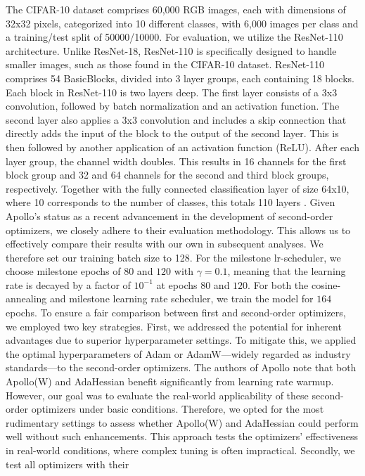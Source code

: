The CIFAR-10 dataset comprises 60,000 RGB images, each with dimensions of 32x32 pixels,
categorized into 10 different classes, with 6,000 images per class and a training/test split of 50000/10000.
For evaluation, we utilize the ResNet-110 architecture.
Unlike ResNet-18, ResNet-110 is specifically designed to handle smaller images,
such as those found in the CIFAR-10 dataset. ResNet-110 comprises 54 BasicBlocks,
divided into 3 layer groups, each containing 18 blocks. Each block in ResNet-110 is two layers deep.
The first layer consists of a 3x3 convolution, followed by batch normalization and an
activation function. The second layer also applies a 3x3 convolution and includes a
skip connection that directly adds the input of the block to the output of the second
layer. This is then followed by another application of an activation function (ReLU).
After each layer group, the channel width doubles. This results in 16 channels for the first block group and 32 and 64 channels
for the second and third block groups, respectively.
Together with the fully connected classification layer of size 64x10, where 10 corresponds to the number of classes,
this totals 110 layers \cite{Resnet110}.
Given Apollo's status as a recent advancement in the development of second-order optimizers,
we closely adhere to their evaluation methodology. This allows us to effectively compare their results
with our own in subsequent analyses. We therefore set our training batch size to 128. 
For the milestone lr-scheduler, we choose milestone epochs of $80$ and $120$ with
$\gamma=0.1$, meaning that the learning rate is decayed by a factor of $10^{-1}$ at 
epochs $80$ and $120$. For both the cosine-annealing and milestone learning rate scheduler, we train the model
for $164$ epochs. 
To ensure a fair comparison between first and second-order optimizers, we employed two key strategies.
First, we addressed the potential for inherent advantages due to superior hyperparameter settings.
To mitigate this, we applied the optimal hyperparameters of Adam or AdamW—widely regarded as industry
standards—to the second-order optimizers.
The authors of Apollo \cite{apollo} note that both Apollo(W) and AdaHessian benefit significantly
from learning rate warmup. However, our goal was to evaluate the real-world applicability of
these second-order optimizers under basic conditions. Therefore, we opted for the most
rudimentary settings to assess whether Apollo(W) and AdaHessian could perform well
without such enhancements.
This approach tests the optimizers' effectiveness in real-world conditions,
where complex tuning is often impractical. Secondly, we test all optimizers with their
